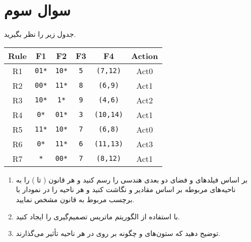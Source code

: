 \section{سوال سوم}

جدول  زیر را نظر بگیرید.

\begin{latin}
	\begin{center}
		\begin{tabular}{|c|c|c|c|c|c|}
			\hline
			\textbf{Rule} & \textbf{F1} & \textbf{F2} & \textbf{F3} & \textbf{F4} & \textbf{Action} \\
			\hline\hline
			R1 & \texttt{01*} & \texttt{10*} & \texttt{5} & \texttt{(7,12)} & Act0 \\
			\hline\hline
			R2 & \texttt{00*} & \texttt{11*} & \texttt{8} & \texttt{(6,9)} & Act1 \\
			\hline
			R3 & \texttt{10*} & \texttt{1*} & \texttt{9} & \texttt{(4,6)} & Act2 \\
			\hline
			R4 & \texttt{0*} & \texttt{01*} & \texttt{3} & \texttt{(10,14)} & Act1 \\
			\hline
			R5 & \texttt{11*} & \texttt{10*} & \texttt{7} & \texttt{(6,8)} & Act0 \\
			\hline
			R6 & \texttt{0*} & \texttt{11*} & \texttt{6} & \texttt{(11,13)} & Act3 \\
			\hline
			R7 & \texttt{*} & \texttt{00*} & \texttt{7} & \texttt{(8,12)} & Act1 \\
			\hline
		\end{tabular}
	\end{center}
\end{latin}




\begin{enumerate}
	\item 
	بر اساس فیلدهای  و  فضای دو بعدی هندسی را رسم کنید و هر قانون ( تا ) را به ناحیه‌های مربوطه بر اساس مقادیر  و  نگاشت کنید و هر ناحیه را در نمودار با برچسب مربوط به قانون مشخص نمایید.
	
	\item 
	با استفاده از الگوریتم  ماتریس تصمیم‌گیری را ایجاد کنید.
	
	\item 
	توضیح دهید که ستون‌های  و  چگونه بر روی  در هر ناحیه تأثیر می‌گذارند.
\end{enumerate}